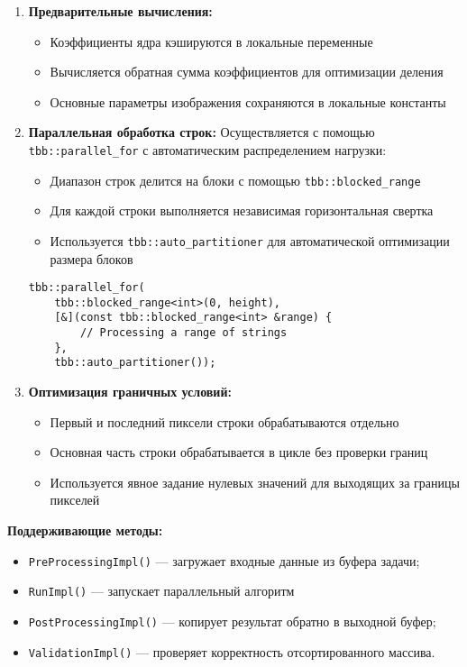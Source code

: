 \documentclass[12pt]{article}
\begin{document}
\begin{enumerate}
\item \textbf{Предварительные вычисления:}
\begin{itemize}
\item Коэффициенты ядра кэшируются в локальные переменные
\item Вычисляется обратная сумма коэффициентов для оптимизации деления
\item Основные параметры изображения сохраняются в локальные константы
\end{itemize}

\item \textbf{Параллельная обработка строк:}
Осуществляется с помощью \texttt{tbb::parallel\_for} с автоматическим распределением нагрузки:
\begin{itemize}
\item Диапазон строк делится на блоки с помощью \texttt{tbb::blocked\_range}
\item Для каждой строки выполняется независимая горизонтальная свертка
\item Используется \texttt{tbb::auto\_partitioner} для автоматической оптимизации размера блоков
\end{itemize}

\begin{lstlisting}
tbb::parallel_for(
    tbb::blocked_range<int>(0, height),
    [&](const tbb::blocked_range<int> &range) {
        // Processing a range of strings
    },
    tbb::auto_partitioner());
\end{lstlisting}

\item \textbf{Оптимизация граничных условий:}
\begin{itemize}
\item Первый и последний пиксели строки обрабатываются отдельно
\item Основная часть строки обрабатывается в цикле без проверки границ
\item Используется явное задание нулевых значений для выходящих за границы пикселей
\end{itemize}
\end{enumerate}

\textbf{Поддерживающие методы:}
\begin{itemize}
  \item \texttt{PreProcessingImpl()} — загружает входные данные из буфера задачи;
  \item \texttt{RunImpl()} — запускает параллельный алгоритм
  \item \texttt{PostProcessingImpl()} — копирует результат обратно в выходной буфер;
  \item \texttt{ValidationImpl()} — проверяет корректность отсортированного массива.
\end{itemize}
\end{document}
